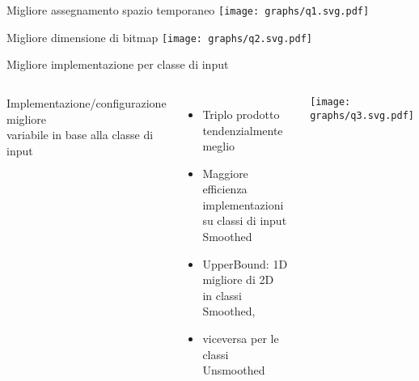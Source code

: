 \begin{frame} {Migliore assegnamento spazio temporaneo}
	\centering
	\texttt{[image: graphs/q1.svg.pdf]}
%
\end{frame}
\begin{frame} {Migliore dimensione di bitmap}
	\centering
	\texttt{[image: graphs/q2.svg.pdf]}
\end{frame}

\begin{frame} {Migliore implementazione per classe di input}
\begin{columns}
	Implementazione/configurazione migliore\\
	variabile in base alla classe di input
	\pause
	\begin{itemize}
		\item	Triplo prodotto tendenzialmente meglio
		\pause
		\item	Maggiore efficienza implementazioni\\
		su classi di input Smoothed
		\pause
		\item	UpperBound: 1D migliore di 2D\\
		in classi Smoothed, 
		\item	viceversa per le classi Unsmoothed
	\end{itemize}
	
	\texttt{[image: graphs/q3.svg.pdf]}
\end{columns}
\end{frame}

